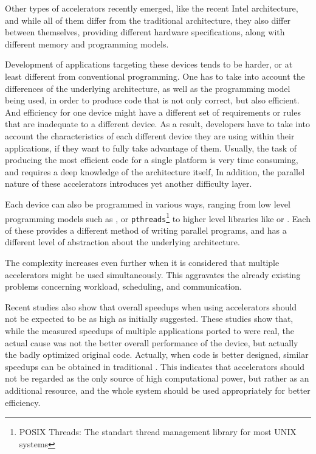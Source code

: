 \documentclass[main.tex]{subfiles}
\begin{document}
Other types of accelerators recently emerged, like the recent Intel \mic architecture, and while all of them differ from the traditional \cpu architecture, they also differ between themselves, providing different hardware specifications, along with different memory and programming models.

Development of applications targeting these devices tends to be harder, or at least different from conventional programming. One has to take into account the differences of the underlying architecture, as well as the programming model being used, in order to produce code that is not only correct, but also efficient. And efficiency for one device might have a different set of requirements or rules that are inadequate to a different device. As a result, developers have to take into account the characteristics of each different device they are using within their applications, if they want to fully take advantage of them. Usually, the task of producing the most efficient code for a single platform is very time consuming, and requires a deep knowledge of the architecture itself, In addition, the parallel nature of these accelerators introduces yet another difficulty layer.

Each device can also be programmed in various ways, ranging from low level programming models such as \cuda, \opencl or \texttt{pthreads}\footnote{POSIX Threads: The standart thread management library for most UNIX systems} to higher level libraries like \openmp or \openacc. Each of these provides a different method of writing parallel programs, and has a different level of abstraction about the underlying architecture.

The complexity increases even further when it is considered that multiple accelerators might be used simultaneously. This aggravates the already existing problems concerning workload, scheduling, and communication.

Recent studies \cite{lee2010debunking,bordawekar2010believe} also show that overall speedups when using accelerators should not be expected to be as high as initially suggested. These studies show that, while the measured speedups of multiple applications ported to \gpus were real, the actual cause was not the better overall performance of the device, but actually the badly optimized original \cpu code. Actually, when code is better designed, similar speedups can be obtained in traditional \cpus. This indicates that accelerators should not be regarded as the only source of high computational power, but rather as an additional resource, and the whole system should be used appropriately for better efficiency.
\end{document}
